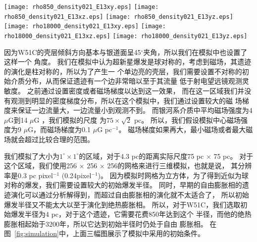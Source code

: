 \begin{figure*}
    \centering
    \texttt{[image: rho850\_density021\_E13xy.eps]}
    \texttt{[image: rho850\_density021\_E13xz.eps]}
    \texttt{[image: rho850\_density021\_E13yz.eps]}\newline
    \texttt{[image: rho18000\_density021\_E13xy.eps]}
    \texttt{[image: rho18000\_density021\_E13xz.eps]}
    \texttt{[image: rho18000\_density021\_E13yz.eps]}
    \caption{模拟的密度-磁场图像。所有的图都是沿着一个三维立体图像沿着中心切片后得到的
    从不同方向看的结果。背景彩色图像是密度分布，白色箭头显示了磁场的方向和强度。上面三幅
    显示的是初始条件，下面三幅显示了经过18000年演化后的结果。上面三幅图中，中心磁场的强度
    是9$\mu G$。}
\label{fig:simulation}
\end{figure*}

因为W51C的壳层倾斜方向基本与银道面呈45$^{\circ}$夹角，所以我们在模拟中也设置了这样一个
角度。
我们在模拟中认为超新星爆发是球对称的，考虑到磁场，其遗迹的演化是柱对称的，所以为了产生一
个单边亮的壳层，我们需要设置不对称的初始介质分布，从而保证遗迹有一个边非常暗以至于其流量
低于射电望远镜观测灵敏度。
之前\citet{Orlando2007}通过设置密度或者磁场梯度以达到这一效果，
而在这一区域我们并没有观测到明显的密度梯度分布，所以在这个模拟中，我们通过设置较大的磁
场梯度来保证一边流量大，一边流量小到观测不到。
而银河系介质中平均磁场强度为4 $\mu$G到14 $\mu$G \citep{Haverkorn2015}，我们模拟的尺度
为$75 \times \sqrt{2}$ pc。
所以，我们假设模拟中心磁场强度为9 $\mu$G，而磁场梯度为0.1 $\mu$G pc$^{-1}$。
磁场梯度如果再大，最小磁场或者最大磁场就会超过比较合理的范围。

我们模拟了大小为$1^\circ \times 1^\circ$的区域，对于4.3 pc的距离实际尺度75 pc $\times$
75 pc。
对于这个区域，我们使用256 $\times$ 256 $\times$ 256的网格来进行三维模拟，也就是说，
其分辨率是0.3 pc pixel$^{-1}$ (0.24\am pixel$^{-1}$)。
因为模拟时网格为立方体，为了得到近似为球对称的爆发，我们需要设置较大的初始爆发半径。
同时，早期的自由膨胀相的遗迹演化可以通过分析解得到，而超过自由膨胀相的演化就不太适合了，
所以初始爆发半径又不能太大以至于演化到绝热膨胀相。
所以，对于W51C，我们选取初始爆发半径为4 pc，对于这个遗迹，它需要花费850年达到这个
半径，而他的绝热膨胀相起始于3200年\citep{Leahy2017a}，所以它达到初始半径时仍处于自由
膨胀相。
在图~\ref{fig:simulation}中，上面三幅图展示了模拟中采用的初始条件。

